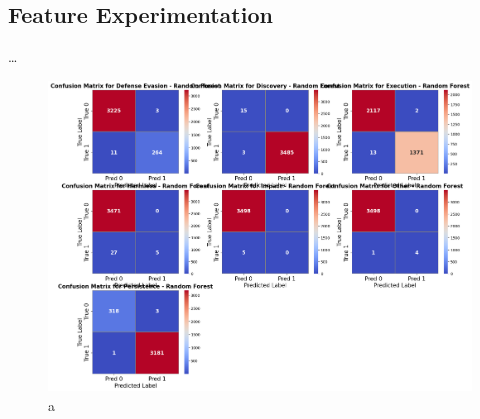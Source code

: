         
    \subsection{Feature Experimentation}
        
        \ldots
        
        
        
        
        \clearpage

        
        \begin{figure}[H]
        
            \centering
            
            \begin{minipage}{\textwidth}
                \begin{minipage}[c]{0.48\textwidth}
                    \centering
                    \includegraphics[width=\textwidth]{../figures/plots/section2/Random_Forest_base_evaluation.png}
                    \caption{a}
                    \label{fig:a}
                \end{minipage}%
                \hfill%
                \begin{minipage}[c]{0.48\textwidth}
                    \centering

\end{minipage}
\end{minipage}
\end{figure}
